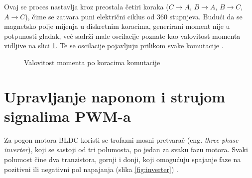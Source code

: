 \documentclass[diplomskirad]{fer}
\begin{document}
Ovaj se proces nastavlja kroz preostala četiri koraka ($C \to A$, $B \to A$, $B
	\to C$, $A \to C$), čime se zatvara puni električni ciklus od 360 stupnjeva.
Budući da se magnetsko polje mijenja u diskretnim koracima, generirani moment
nije u potpunosti gladak, već sadrži male oscilacije poznate kao valovitost
momenta vidljive na slici \ref{fig:valovitost_momenta}. Te se oscilacije
pojavljuju prilikom svake komutacije \cite{TI2015}. \label{trap:torque-ripple}
\begin{figure}[h!]
	\centering
	\caption{Valovitost momenta po koracima komutacije}
	\label{fig:valovitost_momenta}
\end{figure}
\newpage

\section{Upravljanje naponom i strujom signalima PWM-a}
\label{sec:trofazno_upravljanje}

Za pogon motora BLDC koristi se trofazni mosni pretvarač (eng.
\textit{three-phase inverter}), koji se sastoji od tri polumosta, po jedan za
svaku fazu motora. Svaki polumost čine dva tranzistora, gornji i donji, koji
omogućuju spajanje faze na pozitivni ili negativni pol napajanja (slika
\ref{fig:inverter}) \cite{TI2015,ST_AN1946,MicrochipAN885}.
\end{document}
